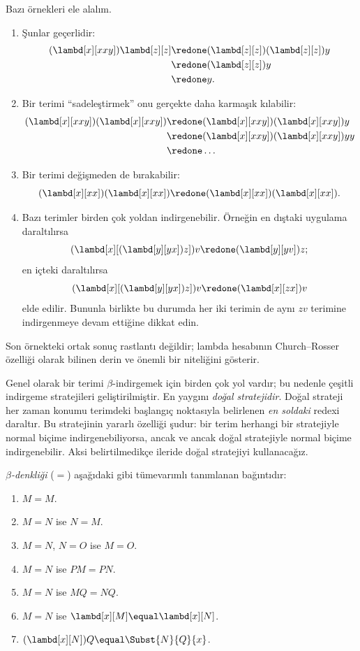 Bazı örnekleri ele alalım.
\begin{enumerate}
\item Şunlar geçerlidir:
\begin{align*}
(\lambd[x][xxy]) \lambd[z][z] & \redone (\lambd[z][z])(\lambd[z][z]) y \\
& \redone (\lambd[z][z]) y \\
& \redone y.
\end{align*}
\item Bir terimi ``sadeleştirmek'' onu gerçekte daha karmaşık kılabilir:
\begin{align*}
(\lambd[x][xxy])(\lambd[x][xxy]) & \redone (\lambd[x][xxy])(\lambd[x][xxy])y \\
& \redone (\lambd[x][xxy])(\lambd[x][xxy])yy \\
& \redone \dots
\end{align*}
\item Bir terimi değişmeden de bırakabilir:
\[
(\lambd[x][xx])(\lambd[x][xx]) \redone (\lambd[x][xx])(\lambd[x][xx]).
\]
\item Bazı terimler birden çok yoldan indirgenebilir. Örneğin en dıştaki
uygulama daraltılırsa
\[
(\lambd[x][(\lambd[y][yx]) z]) v \redone (\lambd[y][yv]) z;
\]
en içteki daraltılırsa
\[
(\lambd[x][(\lambd[y][yx]) z]) v \redone (\lambd[x][zx]) v
\]
elde edilir. Bununla birlikte bu durumda her iki terimin de aynı $zv$
terimine indirgenmeye devam ettiğine dikkat edin.
\end{enumerate}

Son örnekteki ortak sonuç rastlantı değildir; lambda hesabının
Church--Rosser özelliği olarak bilinen derin ve önemli bir niteliğini gösterir.

\begin{digress}
  Genel olarak bir terimi $\beta$-indirgemek için birden çok yol vardır; bu
  nedenle çeşitli indirgeme stratejileri geliştirilmiştir. En yaygını
  \emph{doğal stratejidir}. Doğal strateji her zaman konumu terimdeki başlangıç
  noktasıyla belirlenen \emph{en soldaki} redexi daraltır. Bu stratejinin
  yararlı özelliği şudur: bir terim herhangi bir stratejiyle normal biçime
  indirgenebiliyorsa, ancak ve ancak doğal stratejiyle normal biçime
  indirgenebilir. Aksi belirtilmedikçe ileride doğal stratejiyi kullanacağız.
\end{digress}

\begin{defn}
  \emph{$\beta$-denkliği} ($\equal$) aşağıdaki gibi tümevarımlı tanımlanan
  bağıntıdır:
  \begin{enumerate}
  \item $M \equal M$.
  \item $M \equal N$ ise $N \equal M$.
  \item $M \equal N$, $N \equal O$ ise $M \equal O$.
  \item $M \equal N$ ise $PM \equal PN$.
  \item $M \equal N$ ise $MQ \equal NQ$.
  \item $M \equal N$ ise $\lambd[x][M] \equal \lambd[x][N]$.
  \item $(\lambd[x][N])Q \equal \Subst{N}{Q}{x}$.
  \end{enumerate}
\end{defn}

